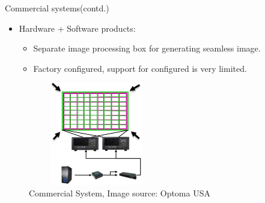 \documentclass{beamer}
\begin{document}

\begin{frame}{Commercial systems(contd.)}
\begin{itemize}
\item Hardware + Software products:
\begin{itemize}
\item Separate image processing box for generating seamless image.
\item Factory configured, support for configured is very limited.
\end{itemize}
\end{itemize}

\begin{figure}
\includegraphics[width=6cm,height=4.5cm]{figures/commercial.jpg}
\caption{Commercial System, Image source: Optoma USA}
\end{figure}

\end{frame}

\end{document}
